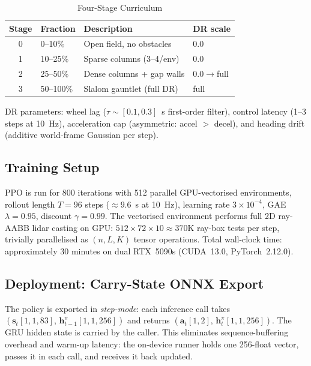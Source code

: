 \documentclass[letterpaper, 10pt, journal]{IEEEtran}
\begin{document}
\begin{table}[h]
\centering
\caption{Four-Stage Curriculum}
\label{tab:curriculum}
\begin{tabular}{@{}clll@{}}
\toprule
Stage & Fraction & Description & DR scale \\
\midrule
0 & 0--10\%  & Open field, no obstacles         & 0.0 \\
1 & 10--25\% & Sparse columns (3--4/env)        & 0.0 \\
2 & 25--50\% & Dense columns + gap walls        & 0.0$\to$full \\
3 & 50--100\%& Slalom gauntlet (full DR)        & full \\
\bottomrule
\end{tabular}
\end{table}

\noindent DR parameters: wheel lag ($\tau \sim [0.1, 0.3]$~s first-order filter),
control latency (1--3 steps at 10~Hz), acceleration cap (asymmetric: accel $>$
decel), and heading drift (additive world-frame Gaussian per step).

\subsection{Training Setup}

PPO is run for 800 iterations with 512 parallel GPU-vectorised environments, rollout
length $T{=}96$ steps ($\approx$9.6~s at 10~Hz), learning rate $3{\times}10^{-4}$,
GAE $\lambda{=}0.95$, discount $\gamma{=}0.99$. The vectorised environment performs
full 2D ray-AABB lidar casting on GPU: $512 \times 72 \times 10 \approx 370\text{K}$
ray-box tests per step, trivially parallelised as $(n, L, K)$ tensor operations.
Total wall-clock time: approximately 30 minutes on dual RTX~5090s (CUDA~13.0,
PyTorch~2.12.0).

\subsection{Deployment: Carry-State ONNX Export}

The policy is exported in \emph{step-mode}: each inference call takes
$(\mathbf{s}_t[1,1,83],\, \mathbf{h}^{\pi}_{t-1}[1,1,256])$ and returns
$(\mathbf{a}_t[1,2],\, \mathbf{h}^{\pi}_{t}[1,1,256])$.
The GRU hidden state is carried by the caller. This eliminates sequence-buffering
overhead and warm-up latency: the on-device runner holds one 256-float vector,
passes it in each call, and receives it back updated.
\end{document}

